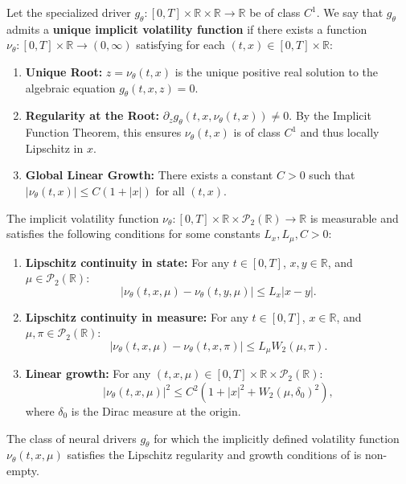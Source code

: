 \documentclass[10pt,a4paper]{amsart}
\newcommand{\Pcal}{\mathcal{P}}
\newcommand{\R}{\mathbb{R}}
\newcommand{\abs}[1]{\left\lvert#1\right\rvert}
\begin{document}
\begin{assumption}
\label{ass:implicit_vol}
Let the specialized driver $g_\theta: [0,T] \times \R \times \R \to \R$ be of class $C^1$. We say that $g_\theta$ admits a \textbf{unique implicit volatility function} if there exists a function $\nu_\theta: [0,T] \times \R \to (0, \infty)$ satisfying for each $(t,x) \in [0,T] \times \R$:
\begin{enumerate}[label=(\alph*)]
    \item \textbf{Unique Root:} $z = \nu_\theta(t,x)$ is the unique positive real solution to the algebraic equation $g_\theta(t,x,z) = 0$.
    \item \textbf{Regularity at the Root:} $\partial_z g_\theta(t,x,\nu_\theta(t,x)) \neq 0$. By the Implicit Function Theorem, this ensures $\nu_\theta(t,x)$ is of class $C^1$ and thus locally Lipschitz in $x$.
    \item \textbf{Global Linear Growth:} There exists a constant $C > 0$ such that $|\nu_\theta(t,x)| \le C(1+|x|)$ for all $(t,x)$.
\end{enumerate}
\end{assumption}

\begin{assumption}
\label{ass:mckean_lipschitz_revised}
The implicit volatility function $\nu_\theta: [0,T] \times \R \times \Pcal_2(\R) \to \R$ is measurable and satisfies the following conditions for some constants $L_x, L_\mu, C > 0$:
\begin{enumerate}[label=(\roman*)]
    \item \textbf{Lipschitz continuity in state:} For any $t \in [0,T]$, $x, y \in \R$, and $\mu \in \Pcal_2(\R)$:
    \[ \abs{\nu_\theta(t, x, \mu) - \nu_\theta(t, y, \mu)} \le L_x \abs{x - y}. \]
    \item \textbf{Lipschitz continuity in measure:} For any $t \in [0,T]$, $x \in \R$, and $\mu, \pi \in \Pcal_2(\R)$:
    \[ \abs{\nu_\theta(t, x, \mu) - \nu_\theta(t, x, \pi)} \le L_\mu W_2(\mu, \pi). \]
    \item \textbf{Linear growth:} For any $(t, x, \mu) \in [0,T] \times \R \times \Pcal_2(\R)$:
    \[ \abs{\nu_\theta(t, x, \mu)}^2 \le C^2(1 + \abs{x}^2 + W_2(\mu, \delta_0)^2), \]
    where $\delta_0$ is the Dirac measure at the origin.
\end{enumerate}
\end{assumption}

\begin{theorem}
\label{thm:mckean_driver_existence}
The class of neural drivers $g_\theta$ for which the implicitly defined volatility function $\nu_\theta(t,x,\mu)$ satisfies the Lipschitz regularity and growth conditions of  is non-empty.
\end{theorem}
\end{document}
